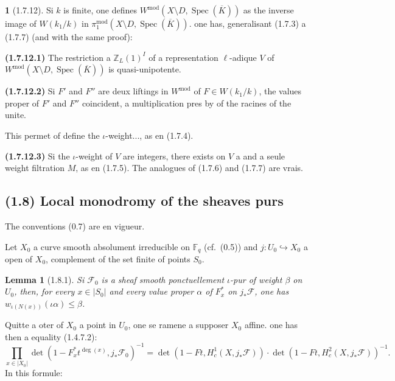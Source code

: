 \documentclass[12pt,a4paper]{article}
\theoremstyle{plain}
\newtheorem{lemma}[theorem]{Lemma}
\theoremstyle{definition}
\theoremstyle{definition}
\newtheorem{para}{}[section]
\theoremstyle{remark}
\DeclareMathOperator{\Spec}{Spec}
\begin{document}
\begin{para}[1.7.12]
Si $k$ is finite, one defines $W^{\text{mod}}(X \setminus D, \Spec(\overline{K}))$ as the inverse image of $W(k_1/k)$ in $\pi_1^{\text{mod}}(X \setminus D, \Spec(\overline{K}))$. one has, generalisant (1.7.3) a (1.7.7) (and with the same proof):

\textbf{(1.7.12.1)} The restriction a $\mathbb{Z}_L(1)^I$ of a representation $\ell$-adique $V$ of $W^{\text{mod}}(X \setminus D, \Spec(\overline{K}))$ is quasi-unipotente.

\textbf{(1.7.12.2)} Si $F'$ and $F''$ are deux liftings in $W^{\text{mod}}$ of $F \in W(k_1/k)$, the values proper of $F'$ and $F''$ coincident, a multiplication pres by of the racines of the unite.

This permet of define the $\iota$-weight..., as en (1.7.4).

\textbf{(1.7.12.3)} Si the $\iota$-weight of $V$ are integers, there exists on $V$ a and a seule weight filtration $M$, as en (1.7.5). The analogues of (1.7.6) and (1.7.7) are vrais.
\end{para}

\newpage

\subsection*{(1.8) Local monodromy of the sheaves purs}

The conventions (0.7) are en vigueur.

Let $X_0$ a curve smooth absolument irreducible on $\mathbb{F}_q$ (cf.~(0.5)) and $j: U_0 \hookrightarrow X_0$ a open of $X_0$, complement of the set finite of points $S_0$.

\begin{lemma}[1.8.1]
Si $\mathscr{F}_0$ is a sheaf smooth ponctuellement $\iota$-pur of weight $\beta$ on $U_0$, then, for every $x \in |S_0|$ and every value proper $\alpha$ of $F_x^*$ on $j_* \mathscr{F}$, one has $w_{\iota(N(x))}(\iota\alpha) \leq \beta$.
\end{lemma}

Quitte a oter of $X_0$ a point in $U_0$, one se ramene a supposer $X_0$ affine. one has then a equality (1.4.7.2):
\begin{equation}\tag{1.8.1.1}
\prod_{x \in |X_0|} \det(1 - F_x^* t^{\deg(x)}, j_* \mathscr{F}_0)^{-1} = \det(1 - Ft, H_c^1(X, j_* \mathscr{F})) \cdot \det(1 - Ft, H_c^2(X, j_* \mathscr{F}))^{-1}.
\end{equation}
In this formule:
\end{document}

